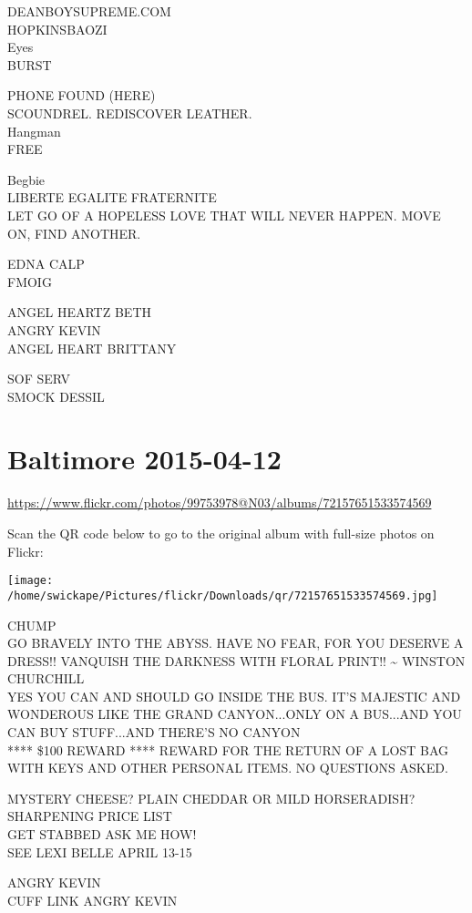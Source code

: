 \documentclass[10pt,letterpaper]{article}
\begin{document}
DEANBOYSUPREME.COM\\
HOPKINSBAOZI\\
Eyes\\
BURST

PHONE FOUND (HERE)\\
SCOUNDREL.  REDISCOVER LEATHER.\\
Hangman\\
FREE

Begbie\\
LIBERTE EGALITE FRATERNITE\\
LET GO OF A HOPELESS LOVE THAT WILL NEVER HAPPEN.  MOVE ON, FIND ANOTHER.

EDNA CALP\\
FMOIG

ANGEL HEARTZ BETH\\
ANGRY KEVIN\\
ANGEL HEART BRITTANY

SOF SERV\\
SMOCK DESSIL


\section*{Baltimore 2015-04-12}

\url{https://www.flickr.com/photos/99753978@N03/albums/72157651533574569}

Scan the QR code below to go to the original album with full-size photos on Flickr:

\texttt{[image: /home/swickape/Pictures/flickr/Downloads/qr/72157651533574569.jpg]}


CHUMP\\
GO BRAVELY INTO THE ABYSS.  HAVE NO FEAR, FOR YOU DESERVE A DRESS!!  VANQUISH THE DARKNESS WITH FLORAL PRINT!!  \textasciitilde{} WINSTON CHURCHILL\\
YES YOU CAN AND SHOULD GO INSIDE THE BUS.  IT'S MAJESTIC AND WONDEROUS LIKE THE GRAND CANYON...ONLY ON A BUS...AND YOU CAN BUY STUFF...AND THERE'S NO CANYON\\
**** \$100 REWARD **** REWARD FOR THE RETURN OF A LOST BAG WITH KEYS AND OTHER PERSONAL ITEMS.  NO QUESTIONS ASKED.

MYSTERY CHEESE?  PLAIN CHEDDAR OR MILD HORSERADISH?\\
SHARPENING PRICE LIST\\
GET STABBED ASK ME HOW!\\
SEE LEXI BELLE APRIL 13{-}15

ANGRY KEVIN\\
CUFF LINK ANGRY KEVIN
\end{document}
